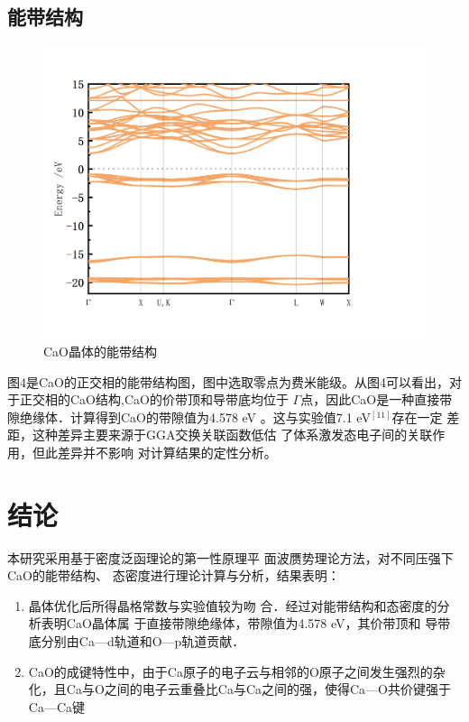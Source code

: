 \documentclass[12pt,a4paper]{article}%
\begin{document}
		\subsection{能带结构}
	\vspace{-1cm}
	\begin{figure}[H]
		\centering
		\includegraphics[width=0.55\linewidth]{img/能带图}
		\caption[CaO晶体的能带结构]{CaO晶体的能带结构}
		\label{fig:}
	\end{figure}
	\vspace{-0.8cm}
	图4是CaO的正交相的能带结构图，图中选取零点为费米能级。从图4可以看出，对于正交相的CaO结构,CaO的价带顶和导带底均位于
	$\Gamma$点，因此CaO是一种直接带隙绝缘体．计算得到CaO的带隙值为4.578 eV 。这与实验值7.1 eV$^{[11]}$存在一定
	差距，这种差异主要来源于GGA交换关联函数低估
	了体系激发态电子间的关联作用，但此差异并不影响
	对计算结果的定性分析。
	\section{结论}
	本研究采用基于密度泛函理论的第一性原理平
	面波赝势理论方法，对不同压强下CaO的能带结构、
	态密度进行理论计算与分析，结果表明：
	\begin{enumerate}
		\item 晶体优化后所得晶格常数与实验值较为吻
		合．经过对能带结构和态密度的分析表明CaO晶体属
		于直接带隙绝缘体，带隙值为4.578 eV，其价带顶和
		导带底分别由Ca—d轨道和O—p轨道贡献．
		\item CaO的成键特性中，由于Ca原子的电子云与相邻的O原子之间发生强烈的杂化，且Ca与O之间的电子云重叠比Ca与Ca之间的强，使得Ca—O共价键强于Ca—Ca键
	\end{enumerate}

	\newpage
	
\end{document}
